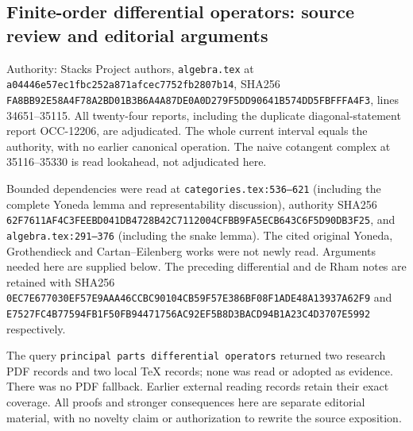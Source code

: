 \subsection{Finite-order differential operators: source review and editorial arguments}\label{algebra-proof-043-finite-order-differential-operators-source-review-and-editorial-arguments}

Authority: Stacks Project authors, \texttt{algebra.tex} at \texttt{a044\allowbreak{}46e5\allowbreak{}7ec1\allowbreak{}fbc2\allowbreak{}52a8\allowbreak{}71af\allowbreak{}cec7\allowbreak{}752f\allowbreak{}b280\allowbreak{}7b14}, SHA256 \texttt{FA8B\allowbreak{}B92E\allowbreak{}58A4\allowbreak{}F78A\allowbreak{}2BD0\allowbreak{}1B3B\allowbreak{}6A4A\allowbreak{}87DE\allowbreak{}0A0D\allowbreak{}279F\allowbreak{}5DD9\allowbreak{}0641\allowbreak{}B574\allowbreak{}DD5F\allowbreak{}BFFF\allowbreak{}A4F3}, lines 34651--35115. All twenty-four reports, including the duplicate diagonal-statement report OCC-12206, are adjudicated. The whole current interval equals the authority, with no earlier canonical operation. The naive cotangent complex at 35116--35330 is read lookahead, not adjudicated here.

Bounded dependencies were read at \texttt{categories.tex:536–621} (including the complete Yoneda lemma and representability discussion), authority SHA256 \texttt{62F7\allowbreak{}611A\allowbreak{}F4C3\allowbreak{}FEEB\allowbreak{}D041\allowbreak{}DB47\allowbreak{}28B4\allowbreak{}2C71\allowbreak{}1200\allowbreak{}4CFB\allowbreak{}B9FA\allowbreak{}5ECB\allowbreak{}643C\allowbreak{}6F5D\allowbreak{}90DB\allowbreak{}3F25}, and \texttt{algebra.tex:291–376} (including the snake lemma). The cited original Yoneda, Grothendieck and Cartan--Eilenberg works were not newly read. Arguments needed here are supplied below. The preceding differential and de Rham notes are retained with SHA256 \texttt{0EC7\allowbreak{}E677\allowbreak{}030E\allowbreak{}F57E\allowbreak{}9AAA\allowbreak{}46CC\allowbreak{}BC90\allowbreak{}104C\allowbreak{}B59F\allowbreak{}57E3\allowbreak{}86BF\allowbreak{}08F1\allowbreak{}ADE4\allowbreak{}8A13\allowbreak{}937A\allowbreak{}62F9} and \texttt{E752\allowbreak{}7FC4\allowbreak{}B775\allowbreak{}94FB\allowbreak{}1F50\allowbreak{}FB94\allowbreak{}4717\allowbreak{}56AC\allowbreak{}92EF\allowbreak{}5B8D\allowbreak{}3BAC\allowbreak{}D94B\allowbreak{}1A23\allowbreak{}C4D3\allowbreak{}707E\allowbreak{}5992} respectively.

The query \texttt{principal\ parts\ differential\ operators} returned two research PDF records and two local TeX records; none was read or adopted as evidence. There was no PDF fallback. Earlier external reading records retain their exact coverage. All proofs and stronger consequences here are separate editorial material, with no novelty claim or authorization to rewrite the source exposition.

